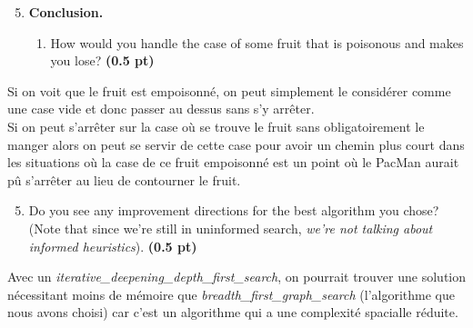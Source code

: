 \documentclass[11pt,a4paper]{../template/report}
\begin{document}
\begin{enumerate}
\setcounter{enumi}{4}
\item \textbf{Conclusion.}
\begin{enumerate}
        \item How would you handle the case of some fruit that is poisonous and makes
you lose?
\textbf{(0.5 pt)}
\end{enumerate}

\end{enumerate}

\begin{answer}
Si on voit que le fruit est empoisonné, on peut simplement le considérer comme une case vide et donc passer au dessus sans s'y arrêter. \\
Si on peut s'arrêter sur la case où se trouve le fruit sans obligatoirement le manger alors on peut se servir de cette case pour avoir un chemin plus court dans les situations où la case de ce fruit empoisonné est un point où le PacMan aurait pû s'arrêter au lieu de contourner le fruit.
\end{answer}

\begin{enumerate}
\setcounter{enumi}{4}
\begin{enumerate}
\setcounter{enumii}{4}
        \item  Do you see any improvement directions for the best algorithm you chose? (Note that since we're still in uninformed search, \textit{we're not talking about informed heuristics}). \textbf{(0.5 pt)}
\end{enumerate}

\end{enumerate}

\begin{answer}
Avec un \textit{iterative\_deepening\_depth\_first\_search}, on pourrait trouver une solution nécessitant moins de mémoire que \textit{breadth\_first\_graph\_search} (l'algorithme que nous avons choisi) car c'est un algorithme qui a une complexité spacialle réduite.
\end{answer}
\end{document}
